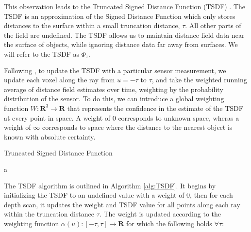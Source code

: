 \documentclass[10pt,twocolumn,letterpaper]{article}
\begin{document}
This observation leads to the Truncated Signed Distance Function (TSDF)
\cite{Curless1996}. The TSDF is an approximation of the  Signed Distance
Function which only stores distances to the surface within a small truncation
distance, $\tau$.  All other parts of the field are undefined. The TSDF allows
us to maintain distance field data near the surface of objects, while ignoring
distance data far away from surfaces. We will refer to the TSDF as
$\Phi_{\tau}$.

Following \cite{Curless1996}, to update the TSDF with a particular sensor
measurement, we update each voxel along the ray from $u = -\tau$ to $\tau$, and
take the weighted running average of distance field estimates over time, weighting by the
probability distribution of the sensor. To do this, we can introduce a global
weighting function $W : \mathbf{R}^3 \to \mathbf{R}$ that represents the
confidence in the estimate of the TSDF at every point in space. A weight of $0$
corresponds to unknown space, wheras a weight of $\infty$ corresponds to space
where the distance to the nearest object is known with absolute certainty.

\begin{algorithm} 
	\caption{Truncated Signed Distance Function}
	\label{alg:TSDF}
	\begin{algorithmic}
		\EndFor
					\EndIf
			    \EndFor
				a
				\EndFor
			\EndFor
		\EndFor
	\end{algorithmic}
\end{algorithm}

The TSDF algorithm is outlined in Algorithm \ref{alg:TSDF}. It begins by
initializing the TSDF to an undefined value with a weight of $0$, then for each
depth scan, it updates the weight and TSDF value for all points along each ray
within the truncation distance $\tau$. The weight is updated according
to the weighting function $\alpha(u) : [-\tau,\tau]\to \mathbf{R} $  for which
the following holds $\forall \tau$:
\end{document}
